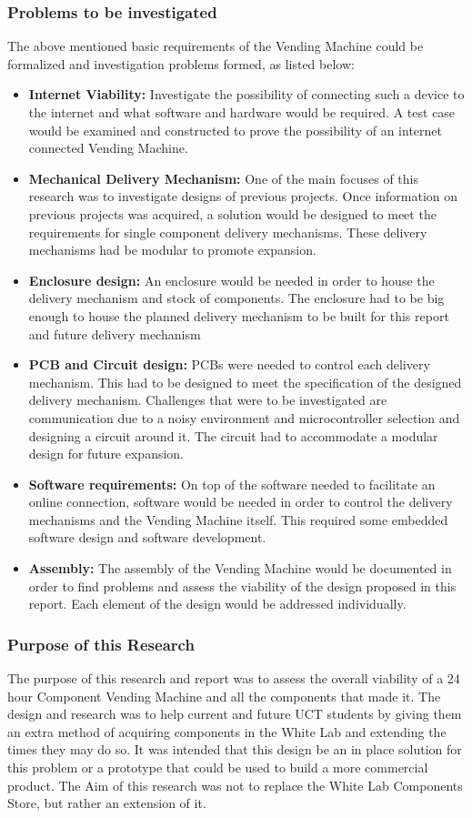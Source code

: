 \documentclass[a4paper,11pt]{article}
\numberwithin{figure}{section}
\numberwithin{table}{section}
\begin{document}
		\subsubsection{Problems to be investigated}
The above mentioned basic requirements of the Vending Machine could be formalized and investigation problems formed, as listed below:
\begin{itemize}
\item \textbf{Internet Viability:} Investigate the possibility of connecting such a device to the internet and what software and hardware would be required. A test case would be examined and constructed to prove the possibility of an internet connected Vending Machine.
\item \textbf{Mechanical Delivery Mechanism:} One of the main focuses of this research was to investigate designs of previous projects. Once information on previous projects was acquired, a solution would be designed to meet the requirements for single component delivery mechanisms. These delivery mechanisms had be modular to promote expansion.
\item \textbf{Enclosure design:} An enclosure would be needed in order to house the delivery mechanism and stock of components. The enclosure had to be big enough to house the planned delivery mechanism to be built for this report and future delivery mechanism
\item \textbf{PCB and Circuit design:} PCBs were needed to control each delivery mechanism. This had to be designed to meet the specification of the designed delivery mechanism. Challenges that were to be investigated are communication due to a noisy environment and microcontroller selection and designing a circuit around it. The circuit had to accommodate a modular design for future expansion.
\item \textbf{Software requirements:} On top of the software needed to facilitate an online connection, software would be needed in order to control the delivery mechanisms and the Vending Machine itself. This required some embedded software design and software development. 
\item \textbf{Assembly:} The assembly of the Vending Machine would be documented in order to find problems and assess the viability of the design proposed in this report. Each element of the design would be addressed individually.
\end{itemize}
		\subsubsection{Purpose of this Research}
The purpose of this research and report was to assess the overall viability of a 24 hour Component Vending Machine and all the components that made it. The design and research was to help current and future UCT students by giving them an extra method of acquiring components in the White Lab and extending the times they may do so. It was intended that this design be an in place solution for this problem or a prototype that could be used to build a more commercial product. The Aim of this research was not to replace the White Lab Components Store, but rather an extension of it.
\end{document}
